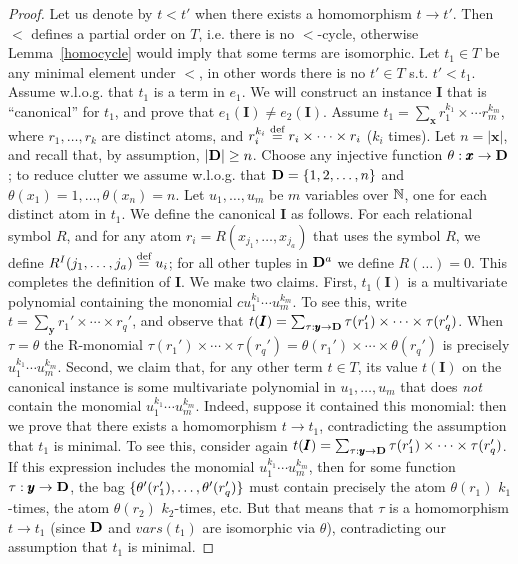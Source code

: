 \begin{proof}
Let us denote by $t < t'$ when there exists a homomorphism
$t \rightarrow t'$.  Then $<$ defines a partial order on $T$,
i.e. there is no $<$-cycle, otherwise Lemma~\ref{homocycle} would
imply that some terms are isomorphic.  Let $t_1 \in T$ be any minimal
element under $<$, in other words there is no $t' \in T$ s.t.
$t' < t_1$.  Assume w.l.o.g. that $t_1$ is a term in $e_1$.  We will
construct an instance $\pmb{I}$ that is ``canonical'' for $t_1$, and
prove that $e_1(\pmb{I}) \neq e_2(\pmb{I})$.  Assume
$t_1 = \sum_{\pmb{x}} r_1^{k_1} \times \cdots r_m^{k_m}$, where
$r_1, \ldots, r_k$ are distinct atoms, and
$r_i^{k_i} \stackrel{\text{def}}{=} r_i \times \cdots \times r_i$ ($k_i$ times).  Let
$n = |\pmb{x}|$, and recall that, by assumption, $|\mathbf D| \geq n$.
Choose any injective function $\theta : \pmb{x} \rightarrow \mathbf D$; to
reduce clutter we assume w.l.o.g. that $\mathbf D = \{1,2,\ldots, n\}$ and
$\theta(x_1) = 1, \ldots, \theta(x_n) = n$.  Let $u_1, \ldots, u_m$ be
$m$ variables over $\mathbb N$, one for each distinct atom in $t_1$.  We define
the canonical $\pmb{I}$ as follows.  For each relational symbol $R$,
and for any atom $r_i = R(x_{j_1}, \ldots, x_{j_a})$ that uses the
symbol $R$, we define $R^I(j_1, \ldots, j_a) \stackrel{\text{def}}{=} u_i$; for all
other tuples in $\mathbf D^a$ we define $R(\ldots) = 0$.  This completes the
definition of $\pmb{I}$.  We make two claims.  First,
$t_1(\pmb{I})$ is a multivariate polynomial containing the monomial $c u_1^{k_1} \cdots u_m^{k_m}$. 
To see this, write
$t = \sum_{\pmb{y}} r_1' \times \cdots \times r_q'$, and observe that
$t(\pmb{I}) = \sum_{\tau: \pmb{y} \rightarrow \mathbf D} \tau(r_1') \times
\cdots \times \tau(r_q')$. When $\tau = \theta$ the R-monomial $\tau(r_1') \times
\cdots \times \tau(r_q') = \theta(r_1') \times
\cdots \times \theta(r_q')$ is precisely $ u_1^{k_1} \cdots u_m^{k_m}$. Second, we claim that,
for any other term $t \in T$, its value $t(\pmb{I})$ on the canonical
instance is some multivariate polynomial in $u_1, \ldots, u_m$ that
does {\em not} contain the monomial $u_1^{k_1} \cdots u_m^{k_m}$.
Indeed, suppose it contained this monomial: then we prove that there
exists a homomorphism $t \rightarrow t_1$, contradicting the
assumption that $t_1$ is minimal.  To see this, consider again $t(\pmb{I}) = \sum_{\tau: \pmb{y} \rightarrow \mathbf D} \tau(r_1') \times
\cdots \times \tau(r_q')$.  If this expression includes the monomial
$u_1^{k_1} \cdots u_m^{k_m}$, then for some function
$\tau : \pmb{y} \rightarrow \mathbf D$, the bag
$\{\theta'(r_1'), \ldots, \theta'(r_q')\}$ must contain precisely
the atom $\theta(r_1)$ $k_1$-times, the atom $\theta(r_2)$
$k_2$-times, etc.  But that means that $\tau$ is a homomorphism
$t \rightarrow t_1$ (since $\mathbf D$ and $vars(t_1)$ are isomorphic via
$\theta$), contradicting our assumption that $t_1$ is minimal.


\end{proof}
